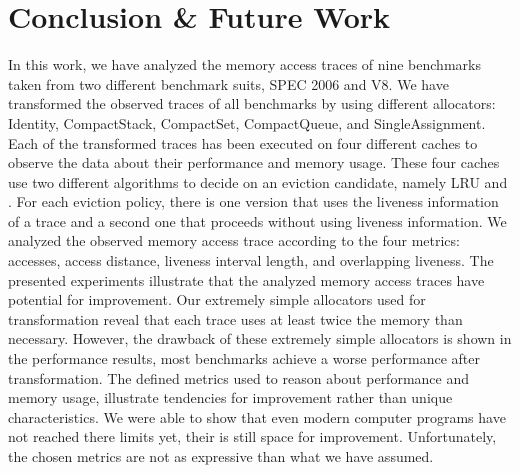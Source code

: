 \documentclass[onecolumn, openright, master, english, signatures]{dbrgrptt}
\begin{document}



\chapter{Conclusion \& Future Work}\label{cha:conclusion}

In this work, we have analyzed the memory access traces of nine benchmarks taken from two different benchmark suits, SPEC 2006 and V8.
We have transformed the observed traces of all benchmarks by using different allocators: Identity, CompactStack, CompactSet, CompactQueue, and SingleAssignment.
Each of the transformed traces has been executed on four different caches to observe the data about their performance and memory usage.
These four caches use two different algorithms to decide on an eviction candidate, namely \ac{LRU} and \citeauthor{belady1966study}.
For each eviction policy, there is one version that uses the liveness information of a trace and a second one that proceeds without using liveness information.
We analyzed the observed memory access trace according to the four metrics: accesses, access distance, liveness interval length, and overlapping liveness.
The presented experiments illustrate that the analyzed memory access traces have potential for improvement.
Our extremely simple allocators used for transformation reveal that each \ac{trace} uses at least twice the memory than necessary.
However, the drawback of these extremely simple allocators is shown in the performance results, most benchmarks achieve a worse performance after transformation.
The defined metrics used to reason about performance and memory usage, illustrate tendencies for improvement rather than unique characteristics.
We were able to show that even modern computer programs have not reached there limits yet, their is still space for improvement.
Unfortunately, the chosen metrics are not as expressive than what we have assumed.
\end{document}

